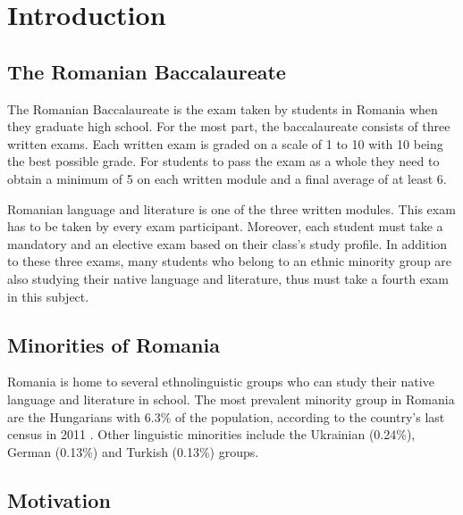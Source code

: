 \section{Introduction}

\subsection{The Romanian Baccalaureate}

The Romanian Baccalaureate \cite{bac} is the exam taken by students in Romania when they graduate high school. For the most part, the baccalaureate consists of three written exams. Each written exam is graded on a scale of 1 to 10 with 10 being the best possible grade. For students to pass the exam as a whole they need to obtain a minimum of 5 on each written module and a final average of at least 6.

Romanian language and literature is one of the three written modules. This exam has to be taken by every exam participant. Moreover, each student must take a mandatory and an elective exam based on their class's study profile. In addition to these three exams, many students who belong to an ethnic minority group are also studying their native language and literature, thus must take a fourth exam in this subject.

\subsection{Minorities of Romania}
\label{ssec:min}

Romania is home to several ethnolinguistic groups who can study their native language and literature in school. The most prevalent minority group in Romania are the Hungarians with 6.3\% of the population, according to the country's last census in 2011 \cite{census}. Other linguistic minorities include the Ukrainian (0.24\%), German (0.13\%) and Turkish (0.13\%) groups.



\subsection{Motivation}
\label{ssec:motiv}


